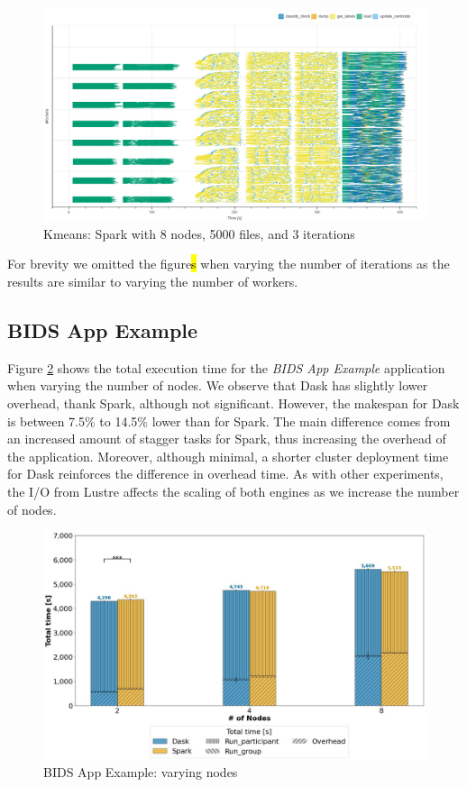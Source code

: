 \documentclass[AMA,STIX1COL]{WileyNJD-v2}
\newcommand{\HL}[1]{\hl{#1}}
\begin{document}
\begin{figure}[!h]
	\centering
	\includegraphics[clip,width=\columnwidth]{figures/spark_kmeans_gantt.png}
	\caption{Kmeans: Spark with 8 nodes, 5000 files, and 3 iterations}
	\label{fig:spark_kmeans_gantt}
\end{figure}

For brevity we omitted the figure\HL{s} when varying the number of iterations as the results are similar to varying the number of workers.
						
\subsection{BIDS App Example}
Figure \ref{fig:bids} shows the total execution time for the \textit{BIDS App Example} application when varying the number of nodes.
We observe that Dask has slightly lower overhead, thank Spark, although not significant.
However, the makespan for Dask is between 7.5\% to 14.5\% lower than for Spark.
The main difference comes from an increased amount of stagger tasks for Spark, thus increasing the overhead of the application.
Moreover, although minimal, a shorter cluster deployment time for Dask reinforces the difference in overhead time.
As with other experiments, the I/O from Lustre affects the scaling of both engines as we increase the number of nodes.
\begin{figure}[!h]
	\centering
	\includegraphics[clip,width=0.75\columnwidth]{figures/stacked_bids.jpg}
	\caption{BIDS App Example: varying nodes}
	\label{fig:bids}
\end{figure}
						
\end{document}
